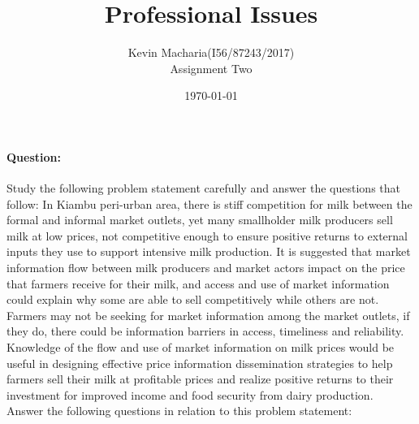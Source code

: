 \documentclass[11pt]{article}
\title{Professional Issues}
\author{Kevin Macharia(I56/87243/2017) \\ Assignment Two }
\date{\today}
\begin{document}
\maketitle
\paragraph{Question:}Study the following problem statement carefully and answer the questions that
follow: In Kiambu peri-urban area, there is stiff competition for milk between
the formal and informal market outlets, yet many smallholder milk producers
sell milk at low prices, not competitive enough to ensure positive returns to
external inputs they use to support intensive milk production. It is suggested
that market information flow between milk producers and market actors impact
on the price that farmers receive for their milk, and access and use of market
information could explain why some are able to sell competitively while others
are not. Farmers may not be seeking for market information among the market
outlets, if they do, there could be information barriers in access, timeliness and
reliability. Knowledge of the flow and use of market information on milk prices
would be useful in designing effective price information dissemination strategies
to help farmers sell their milk at profitable prices and realize positive returns to
their investment for improved income and food security from dairy production. \\
Answer the following questions in relation to this problem statement:
\end{document}
